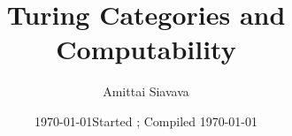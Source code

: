 

\title{%
  Turing Categories and Computability
}
\author{Amittai Siavava
}
\ifoptionfinal
  {\date{\today}}
  {\date{Started ; Compiled \today}}


\maketitle

